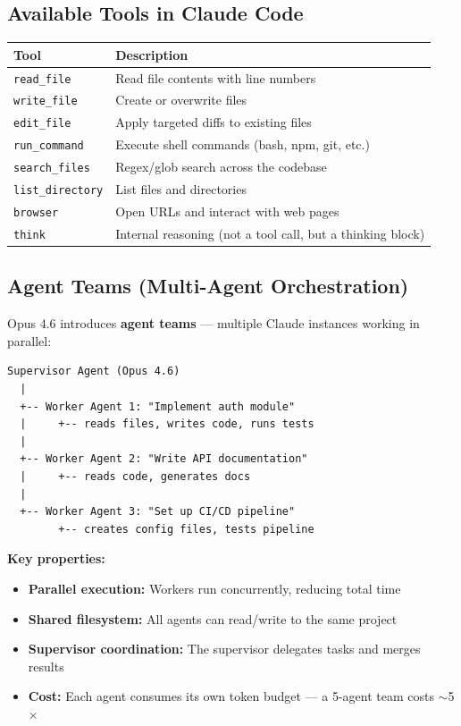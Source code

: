 \documentclass[11pt,a4paper]{article}
\begin{document}
\subsection{Available Tools in Claude Code}

\begin{center}
\begin{tabular}{lL{9cm}}
\toprule
\textbf{Tool} & \textbf{Description} \\
\midrule
\texttt{read\_file} & Read file contents with line numbers \\
\texttt{write\_file} & Create or overwrite files \\
\texttt{edit\_file} & Apply targeted diffs to existing files \\
\texttt{run\_command} & Execute shell commands (bash, npm, git, etc.) \\
\texttt{search\_files} & Regex/glob search across the codebase \\
\texttt{list\_directory} & List files and directories \\
\texttt{browser} & Open URLs and interact with web pages \\
\texttt{think} & Internal reasoning (not a tool call, but a thinking block) \\
\bottomrule
\end{tabular}
\end{center}

\subsection{Agent Teams (Multi-Agent Orchestration)}

Opus 4.6 introduces \textbf{agent teams} --- multiple Claude instances working in parallel:

\begin{tcolorbox}[colback=purple!3, colframe=purple!50!black, title={\bfseries Agent Teams Architecture}]
\begin{lstlisting}[basicstyle=\ttfamily\small, frame=none, backgroundcolor=\color{purple!3}]
Supervisor Agent (Opus 4.6)
  |
  +-- Worker Agent 1: "Implement auth module"
  |     +-- reads files, writes code, runs tests
  |
  +-- Worker Agent 2: "Write API documentation"  
  |     +-- reads code, generates docs
  |
  +-- Worker Agent 3: "Set up CI/CD pipeline"
        +-- creates config files, tests pipeline
\end{lstlisting}
\end{tcolorbox}

\textbf{Key properties:}
\begin{itemize}[itemsep=1pt]
  \item \textbf{Parallel execution:} Workers run concurrently, reducing total time
  \item \textbf{Shared filesystem:} All agents can read/write to the same project
  \item \textbf{Supervisor coordination:} The supervisor delegates tasks and merges results
  \item \textbf{Cost:} Each agent consumes its own token budget --- a 5-agent team costs $\sim$5$\times$
\end{itemize}
\end{document}
